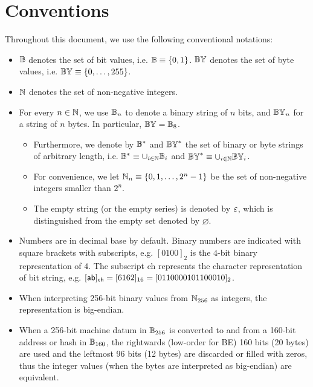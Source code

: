 
\section{Conventions}

Throughout this document, we use the following conventional notations:  
\begin{itemize}[nosep]
	\item $\mathbb{B}$ denotes the set of bit values, i.e. $\mathbb{B}\equiv  \{ 0, 1 \} $. 
	$\mathbb{BY}$ denotes the set of byte values, i.e. $\mathbb{BY}\equiv {\left \{{0,\dots,255} \right \}}$.

	\item $\mathbb{N}$ denotes the set of non-negative integers.


	\item For every $n\in \mathbb{N}$, we use $\mathbb{B}_n$ to denote a binary string of $n$ bits, and $\mathbb{BY}_n$ for a string of $n$ bytes. In particular, $\mathbb{BY}=\mathbb{B}_8$.
	
	\begin{itemize}
		\item Furthermore, we denote by $\mathbb{B}^*$ and $\mathbb{BY}^*$ the set of binary or byte strings of arbitrary length, i.e. $\mathbb{B}^*\equiv \cup_{i\in\mathbb{N}} \mathbb{B}_i$ and $\mathbb{BY}^*\equiv \cup_{i\in\mathbb{N}} \mathbb{BY}_i$. 
	
		\item For convenience, we let $\mathbb{N}_{n}\equiv{\left \{{0,1,\dots, 2^n-1} \right \}}$  be the set of non-negative integers smaller than $2^n$.

		\item The empty string (or the empty series) is denoted by $\mathbb{\varepsilon}$, which is distinguished from the empty set denoted by $\varnothing$.
	\end{itemize}

	\item Numbers are in decimal base by default. Binary numbers are indicated with square brackets with subscripts, e.g. $[0100]_2$ is the $4$-bit binary representation of $4$. The subscript \textsf{ch} represents the character representation of bit string, e.g. $[{\sf ab}]_{\sf ch}=[6162]_{16}=[0110000101100010]_2$.

	\item When interpreting 256-bit binary values from $\mathbb{N}_{256}$ as integers, the representation is big-endian.

	\item When a 256-bit machine datum in $\mathbb{B}_{256}$ is converted to and from a 160-bit address or hash in $\mathbb{B}_{160}$, the rightwards (low-order for BE) 160 bits (20 bytes) are used and the leftmost 96 bits (12 bytes) are discarded or filled with zeros, thus the integer values (when the bytes are interpreted as big-endian) are equivalent.


\end{itemize}
